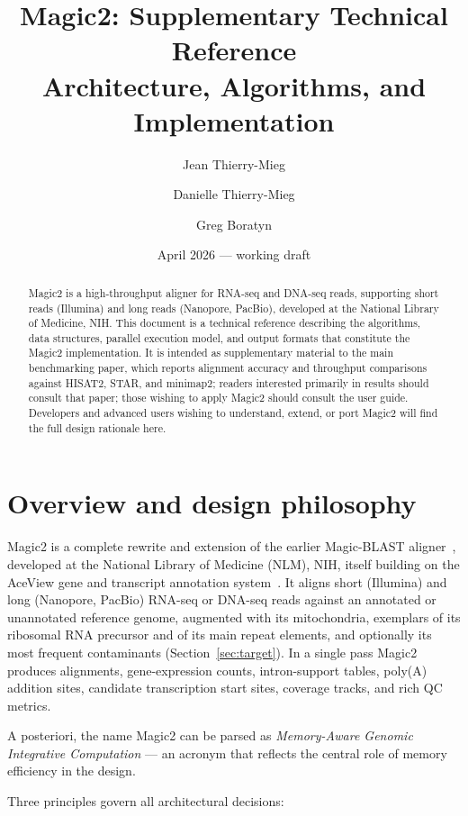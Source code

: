 \documentclass[11pt]{article}
\title{\textbf{Magic2: Supplementary Technical Reference}\\[0.5em]
       \large Architecture, Algorithms, and Implementation}
\author{Jean Thierry-Mieg \and Danielle Thierry-Mieg \and Greg Boratyn}
\date{April 2026 --- working draft}
\begin{document}
\maketitle

\begin{abstract}
Magic2 is a high-throughput aligner for RNA-seq and DNA-seq reads,
supporting short reads (Illumina) and long reads (Nanopore, PacBio),
developed at the National Library of Medicine, NIH.
This document is a technical reference describing the algorithms,
data structures, parallel execution model, and output formats that
constitute the Magic2 implementation.
It is intended as supplementary material to the main benchmarking
paper, which reports alignment accuracy and throughput comparisons
against HISAT2, STAR, and minimap2; readers interested primarily
in results should consult that paper; those wishing to apply
Magic2 should consult the user guide.
Developers and advanced users wishing to understand, extend, or
port Magic2 will find the full design rationale here.
\end{abstract}

\tableofcontents
\clearpage

\section{Overview and design philosophy}
\label{sec:overview}

Magic2 is a complete rewrite and extension of the earlier Magic-BLAST
aligner~\citep{boratyn2019}, developed at the National Library of Medicine (NLM), NIH,
itself building on the AceView gene and transcript annotation
system~\citep{thierrymieg2006}.
It aligns short (Illumina) and long (Nanopore, PacBio) RNA-seq or
DNA-seq reads against an annotated or unannotated reference genome,
augmented with its mitochondria, exemplars of its ribosomal RNA
precursor and of its main repeat elements, and optionally its most
frequent contaminants (Section~\ref{sec:target}).
In a single pass Magic2 produces alignments, gene-expression counts,
intron-support tables, poly(A) addition sites, candidate transcription
start sites, coverage tracks, and rich QC metrics.

A posteriori, the name Magic2 can be parsed as
\emph{Memory-Aware Genomic Integrative Computation} --- an
acronym that reflects the central role of memory
efficiency in the design.

Three principles govern all architectural decisions:
\end{document}
